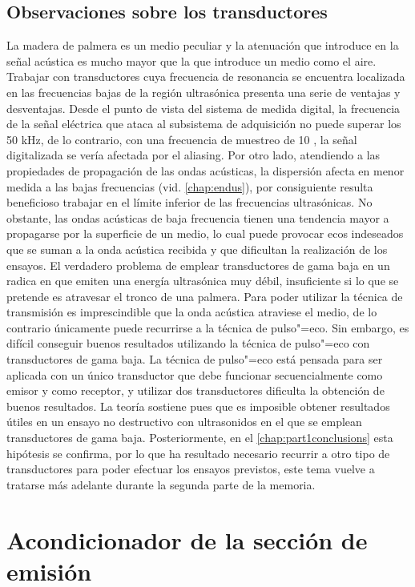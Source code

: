 \subsection{Observaciones sobre los transductores}

La madera de palmera es un medio peculiar y la atenuación que introduce en
la señal acústica es mucho mayor que la que introduce un medio como el
aire. Trabajar con transductores cuya frecuencia de resonancia se encuentra
localizada en las frecuencias bajas de la región ultrasónica presenta una
serie de ventajas y desventajas. Desde el punto de vista del sistema de
medida digital, la frecuencia de la señal eléctrica que ataca al subsistema
de adquisición no puede superar los 50 kHz, de lo contrario, con una
frecuencia de muestreo de 10 \kms{}, la señal digitalizada se vería
afectada por el aliasing. Por otro lado, atendiendo a las propiedades de
propagación de las ondas acústicas, la dispersión afecta en menor medida a
las bajas frecuencias (vid. \cref{chap:endus}), por consiguiente resulta
beneficioso trabajar en el límite inferior de las frecuencias ultrasónicas.
No obstante, las ondas acústicas de baja frecuencia tienen una tendencia
mayor a propagarse por la superficie de un medio, lo cual puede provocar
ecos indeseados que se suman a la onda acústica recibida y que dificultan
la realización de los ensayos. El verdadero problema de emplear
transductores de gama baja en un  radica en que emiten una
energía ultrasónica muy débil, insuficiente si lo que se pretende es
atravesar el tronco de una palmera. Para poder utilizar la técnica de
transmisión es imprescindible que la onda acústica atraviese el medio, de
lo contrario únicamente puede recurrirse a la técnica de pulso"=eco. Sin
embargo, es difícil conseguir buenos resultados utilizando la técnica de
pulso"=eco con transductores de gama baja. La técnica de pulso"=eco está
pensada para ser aplicada con un único transductor que debe funcionar
secuencialmente como emisor y como receptor, y utilizar dos transductores
dificulta la obtención de buenos resultados. La teoría sostiene pues que es
imposible obtener resultados útiles en un ensayo no destructivo con
ultrasonidos en el que se emplean transductores de gama baja.
Posteriormente, en el \cref{chap:part1conclusions} esta hipótesis se
confirma, por lo que ha resultado necesario recurrir a otro tipo de
transductores para poder efectuar los ensayos previstos, este tema vuelve a
tratarse más adelante durante la segunda parte de la memoria.


\section{Acondicionador de la sección de emisión}

